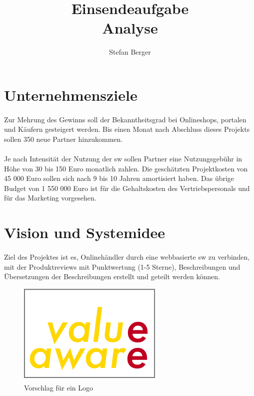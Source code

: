 \documentclass{article}
\begin{document}
\title{\Large Einsendeaufgabe \\ Analyse}
\author{\normalsize Stefan Berger}
\date{}
\maketitle

\vspace{160px}

\pagebreak

\section{Unternehmensziele}
\paragraph{}
Zur Mehrung des Gewinns soll der Bekanntheitsgrad bei Onlineshops, \gls{portal}en und Käufern gesteigert werden. Bis einen Monat nach Abschluss dieses Projekts sollen 350 neue Partner hinzukommen.
\paragraph{}
Je nach Intensität der Nutzung der \gls{sw} sollen Partner eine Nutzungsgebühr in Höhe von 30 bis 150 Euro monatlich zahlen. Die geschätzten Projektkosten von 45 000 Euro sollen sich nach 9 bis 10 Jahren amortisiert haben. Das übrige Budget von 1 550 000 Euro ist für die Gehaltskosten des Vertriebspersonals und für das Marketing vorgesehen.

\section{Vision und Systemidee}
{
  \centering
  \noindent{}

}

\paragraph{}
Ziel des Projektes ist es, Onlinehändler durch eine webbasierte \gls{sw} zu verbinden, mit der Produktreviews mit Punktwertung (1-5 Sterne), Beschreibungen und Übersetzungen der Beschreibungen erstellt und geteilt werden können.

\begin{figure}[h]
  \centering
  \includegraphics[scale=0.5]{logo.png}
  \caption{Vorschlag für ein Logo}
  \label{logo}
\end{figure}
\end{document}
